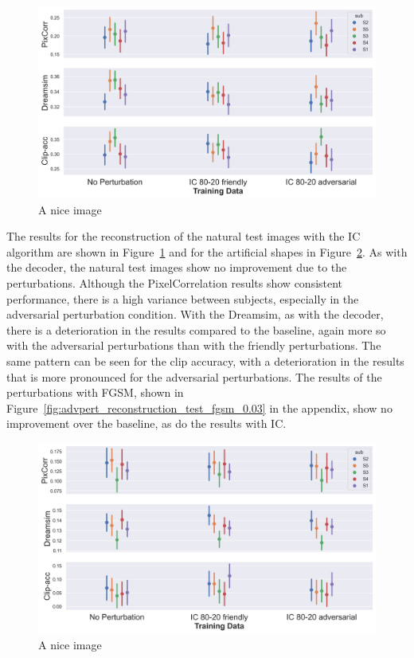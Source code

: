\begin{figure}[ht]
    \centering
    \includegraphics[width=1\textwidth]{plots/advpert_reconstruction_test_ic_80-20.png}
    \caption{A nice image}\label{fig:advpert_reconstruction_test_ic_80}
\end{figure}

The results for the reconstruction of the natural test images with the IC algorithm are shown in Figure~\ref{fig:advpert_reconstruction_test_ic_80} and for the artificial shapes in Figure~\ref{fig:advpert_reconstruction_art_ic_80}. As with the decoder, the natural test images show no improvement due to the perturbations. Although the PixelCorrelation results show consistent performance, there is a high variance between subjects, especially in the adversarial perturbation condition. With the Dreamsim, as with the decoder, there is a deterioration in the results compared to the baseline, again more so with the adversarial perturbations than with the friendly perturbations. The same pattern can be seen for the clip accuracy, with a deterioration in the results that is more pronounced for the adversarial perturbations. The results of the perturbations with FGSM, shown in Figure~\ref{fig:advpert_reconstruction_test_fgsm_0.03} in the appendix, show no improvement over the baseline, as do the results with IC. 

\begin{figure}[ht]
    \centering
    \includegraphics[width=1\textwidth]{plots/advpert_reconstruction_art_ic_80-20.png}
    \caption{A nice image}\label{fig:advpert_reconstruction_art_ic_80}
\end{figure}

